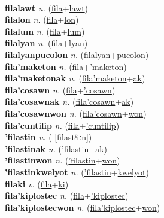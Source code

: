  \label{fila'amelika} \\
\textbf{filalawt} \textit{n.} (\hyperref[fila]{fila}+\hyperref[lawt]{lawt})
 \label{filalawt} \\
\textbf{filalon} \textit{n.} (\hyperref[fila]{fila}+\hyperref[lon]{lon})
 \label{filalon} \\
\textbf{filalum} \textit{n.} (\hyperref[fila]{fila}+\hyperref[lum]{lum})
 \label{filalum} \\
\textbf{filalyan} \textit{n.} (\hyperref[fila]{fila}+\hyperref[lyan]{lyan})
 \label{filalyan} \\
\textbf{filalyanpucolon} \textit{n.} (\hyperref[filalyan]{filalyan}+\hyperref[pucolon]{pucolon})
 \label{filalyanpucolon} \\
\textbf{fila'maketon} \textit{n.} (\hyperref[fila]{fila}+\hyperref['maketon]{'maketon})
 \label{fila'maketon} \\
\textbf{fila'maketonak} \textit{n.} (\hyperref[fila'maketon]{fila'maketon}+\hyperref[ak]{ak})
 \label{fila'maketonak} \\
\textbf{fila'cosawn} \textit{n.} (\hyperref[fila]{fila}+\hyperref['cosawn]{'cosawn})
 \label{fila'cosawn} \\
\textbf{fila'cosawnak} \textit{n.} (\hyperref[fila'cosawn]{fila'cosawn}+\hyperref[ak]{ak})
 \label{fila'cosawnak} \\
\textbf{fila'cosawnwon} \textit{n.} (\hyperref[fila'cosawn]{fila'cosawn}+\hyperref[won]{won})
 \label{fila'cosawnwon} \\
\textbf{fila'cuntilip} \textit{n.} (\hyperref[fila]{fila}+\hyperref['cuntilip]{'cuntilip})
 \label{fila'cuntilip} \\
\textbf{'filastin} \textit{n.} ( [filastˁiːn])
 \label{'filastin} \\
\textbf{'filastinak} \textit{n.} (\hyperref['filastin]{'filastin}+\hyperref[ak]{ak})
 \label{'filastinak} \\
\textbf{'filastinwon} \textit{n.} (\hyperref['filastin]{'filastin}+\hyperref[won]{won})
 \label{'filastinwon} \\
\textbf{'filastinkwelyot} \textit{n.} (\hyperref['filastin]{'filastin}+\hyperref[kwelyot]{kwelyot})
 \label{'filastinkwelyot} \\
\textbf{filaki} \textit{v.} (\hyperref[fila]{fila}+\hyperref[ki]{ki})
 \label{filaki} \\
\textbf{fila'kiplostec} \textit{n.} (\hyperref[fila]{fila}+\hyperref['kiplostec]{'kiplostec})
 \label{fila'kiplostec} \\
\textbf{fila'kiplostecwon} \textit{n.} (\hyperref[fila'kiplostec]{fila'kiplostec}+\hyperref[won]{won})

